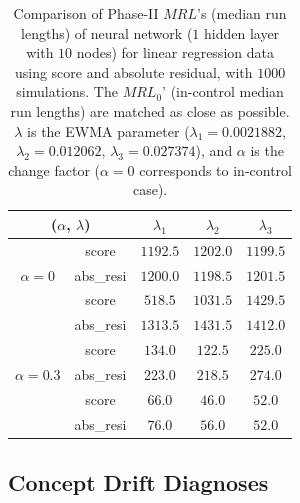 \documentclass[twoside,11pt]{article}
\begin{document}
\begin{table}[!t]
\centering
\begin{tabular}{ccccc}
\toprule
\multicolumn{2}{c}{($ \alpha$, $ \lambda$)} & {$ \lambda_1$} & {$ \lambda_2$} & {$ \lambda_3$} \\
\midrule
\multirow{3}{*}{$\alpha=0$} & score &$1192.5$ & $1202.0$ & $1199.5$ \\
& abs\_resi &$1200.0$ & $1198.5$ & $1201.5$ \\
\midrule
\multirow{3}{*}{$\alpha=0.1$} & score &$\bm {518.5}$ & $\bm{1031.5}$ & $1429.5$ \\
& abs\_resi &$1313.5$ & $1431.5$ & $\bm{1412.0}$ \\
\midrule
\multirow{3}{*}{$\alpha=0.3$} & score &$\bm{134.0}$ & $\bm{122.5}$ & $\bm{225.0}$ \\
& abs\_resi &$223.0$ & $218.5$ & $274.0$ \\
\midrule
\multirow{3}{*}{$\alpha=0.5$} & score &$\bm{66.0}$ & $\bm{46.0}$ & ${52.0}$ \\
& abs\_resi &$76.0$ & $56.0$ & $52.0$ \\
\midrule
\end{tabular}
\caption{Comparison of Phase-II $MRL$'s (median run lengths) of neural network ($1$ hidden layer with $10$ nodes) for linear regression data using score and absolute residual, with $1000$ simulations. The $MRL_0$' (in-control median run lengths) are matched as close as possible. $ \lambda$ is the EWMA parameter ({$ \lambda_1=0.0021882$}, {$ \lambda_2=0.012062$}, {$ \lambda_3=0.027374$}), and $ \alpha$ is the change factor ($ \alpha=0$ corresponds to in-control case).}
\label{tab:lin_nnet_MRL}
\end{table}

\subsection{Concept Drift Diagnoses}
\end{document}
